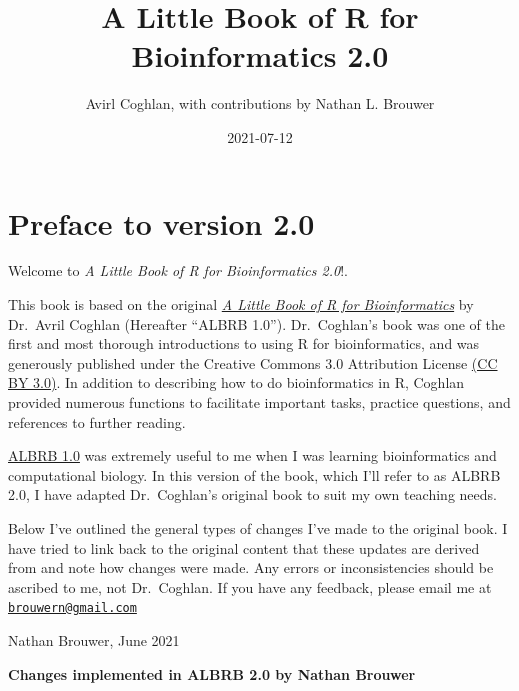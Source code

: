 \documentclass[
]{book}
\title{A Little Book of R for Bioinformatics 2.0}
\author{Avirl Coghlan, with contributions by Nathan L. Brouwer}
\date{2021-07-12}
\begin{document}
\maketitle

{
\setcounter{tocdepth}{1}
\tableofcontents
}
\hypertarget{preface-to-version-2.0}{%
\chapter*{Preface to version 2.0}\label{preface-to-version-2.0}}

Welcome to \emph{A Little Book of R for Bioinformatics 2.0}!.

This book is based on the original \href{https://a-little-book-of-r-for-bioinformatics.readthedocs.io/en/latest/}{\emph{A Little Book of R for Bioinformatics}} by Dr.~Avril Coghlan (Hereafter ``ALBRB 1.0''). Dr.~Coghlan's book was one of the first and most thorough introductions to using R for bioinformatics, and was generously published under the Creative Commons 3.0 Attribution License \href{https://creativecommons.org/licenses/by/3.0/}{(CC BY 3.0)}. In addition to describing how to do bioinformatics in R, Coghlan provided numerous functions to facilitate important tasks, practice questions, and references to further reading.

\href{https://a-little-book-of-r-for-bioinformatics.readthedocs.io/en/latest/}{ALBRB 1.0} was extremely useful to me when I was learning bioinformatics and computational biology. In this version of the book, which I'll refer to as ALBRB 2.0, I have adapted Dr.~Coghlan's original book to suit my own teaching needs.

Below I've outlined the general types of changes I've made to the original book. I have tried to link back to the original content that these updates are derived from and note how changes were made. Any errors or inconsistencies should be ascribed to me, not Dr.~Coghlan. If you have any feedback, please email me at \href{mailto:brouwern@gmail.com}{\nolinkurl{brouwern@gmail.com}}

Nathan Brouwer, June 2021

\textbf{Changes implemented in ALBRB 2.0 by Nathan Brouwer}
\end{document}
